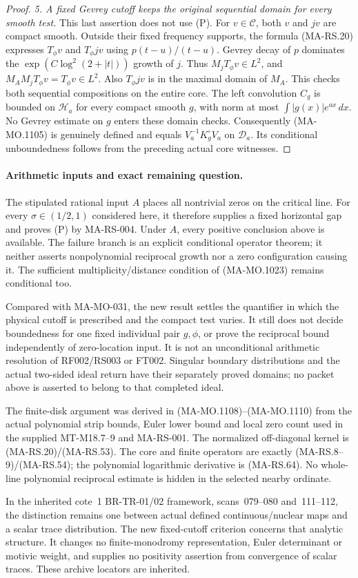 \begin{proof}
\emph{5. A fixed Gevrey cutoff keeps the
original sequential domain for every smooth test.}
This last assertion does not use (P).
For \(v\in\mathscr C\), both \(v\) and
\(jv\) are compact smooth.  Outside their
fixed frequency supports, the formula
(MA-RS.20) expresses \(T_\phi v\) and
\(T_\phi jv\) using \(p(t-u)/(t-u)\).
Gevrey decay of \(p\) dominates the
\(\exp(C\log^2(2+|t|))\) growth of \(j\).
Thus \(M_jT_\phi v\in L^2\), and
\(M_AM_jT_\phi v=T_\phi v\in L^2\).
Also \(T_\phi jv\) is in the maximal
domain of \(M_A\).  This checks both
sequential compositions on the entire
core.  The left convolution \(C_g\)
is bounded on \(\mathcal H_a\) for
every compact smooth \(g\), with norm
at most \(\int|g(x)|e^{ax}\,dx\).
No Gevrey estimate on \(g\) enters these
domain checks.  Consequently (MA-MO.1105)
is genuinely defined and equals
\(V_a^{-1}K^\circ_gV_a\) on \(\mathscr D_a\).
Its conditional unboundedness follows
from the preceding actual core witnesses.
\end{proof}

\paragraph{Arithmetic inputs and exact remaining question.}
The stipulated rational input \(A\) places
all nontrivial zeros on the critical line.
For every \(\sigma\in(1/2,1)\) considered
here, it therefore supplies a fixed
horizontal gap and proves (P) by
MA-RS-004.  Under \(A\), every positive
conclusion above is available.  The
failure branch is an explicit conditional
operator theorem; it neither asserts
nonpolynomial reciprocal growth nor a
zero configuration causing it.  The
sufficient multiplicity/distance condition
of (MA-MO.1023) remains conditional too.

Compared with MA-MO-031, the new result
settles the quantifier in which the
physical cutoff is prescribed and the
compact test varies.  It still does
not decide boundedness for one fixed
individual pair \(g,\phi\), or prove
the reciprocal bound independently of
zero-location input.  It is not an
unconditional arithmetic resolution
of RF002/RS003 or FT002.  Singular
boundary distributions and the actual
two-sided ideal return have their
separately proved domains; no packet
above is asserted to belong to that
completed ideal.

The finite-disk argument was derived
in (MA-MO.1108)--(MA-MO.1110) from the
actual polynomial strip bounds, Euler
lower bound and local zero count used
in the supplied MT-M18.7--9 and
MA-RS-001.  The normalized off-diagonal
kernel is (MA-RS.20)/(MA-RS.53).
The core and finite operators are
exactly (MA-RS.8--9)/(MA-RS.54);
the polynomial logarithmic derivative
is (MA-RS.64).  No whole-line
polynomial reciprocal estimate is
hidden in the selected nearby ordinate.

In the inherited cote~1 BR-TR-01/02
framework, scans~079--080 and~111--112,
the distinction remains one between
actual defined continuous/nuclear
maps and a scalar trace distribution.
The new fixed-cutoff criterion concerns
that analytic structure.  It changes
no finite-monodromy representation,
Euler determinant or motivic weight,
and supplies no positivity assertion
from convergence of scalar traces.
These archive locators are inherited.
